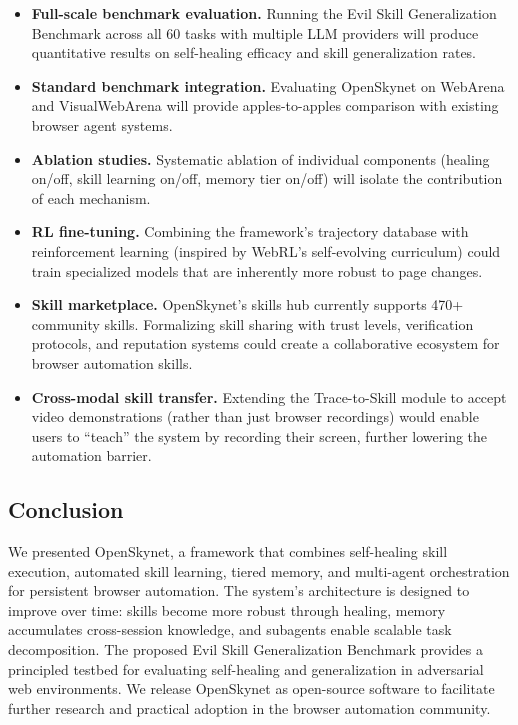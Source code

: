 \begin{itemize}[leftmargin=*,itemsep=2pt]
    \item \textbf{Full-scale benchmark evaluation.} Running the Evil Skill Generalization Benchmark across all 60 tasks with multiple LLM providers will produce quantitative results on self-healing efficacy and skill generalization rates.
    \item \textbf{Standard benchmark integration.} Evaluating OpenSkynet on WebArena and VisualWebArena will provide apples-to-apples comparison with existing browser agent systems.
    \item \textbf{Ablation studies.} Systematic ablation of individual components (healing on/off, skill learning on/off, memory tier on/off) will isolate the contribution of each mechanism.
    \item \textbf{RL fine-tuning.} Combining the framework's trajectory database with reinforcement learning (inspired by WebRL's self-evolving curriculum) could train specialized models that are inherently more robust to page changes.
    \item \textbf{Skill marketplace.} OpenSkynet's skills hub currently supports 470+ community skills. Formalizing skill sharing with trust levels, verification protocols, and reputation systems could create a collaborative ecosystem for browser automation skills.
    \item \textbf{Cross-modal skill transfer.} Extending the Trace-to-Skill module to accept video demonstrations (rather than just browser recordings) would enable users to ``teach'' the system by recording their screen, further lowering the automation barrier.
\end{itemize}

\subsection{Conclusion}

We presented OpenSkynet, a framework that combines self-healing skill execution, automated skill learning, tiered memory, and multi-agent orchestration for persistent browser automation. The system's architecture is designed to improve over time: skills become more robust through healing, memory accumulates cross-session knowledge, and subagents enable scalable task decomposition. The proposed Evil Skill Generalization Benchmark provides a principled testbed for evaluating self-healing and generalization in adversarial web environments. We release OpenSkynet as open-source software to facilitate further research and practical adoption in the browser automation community.
